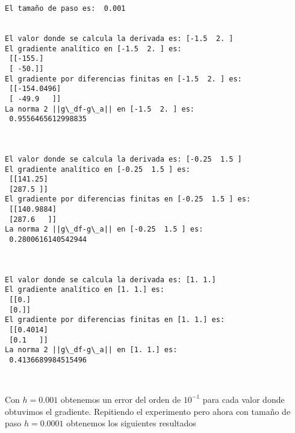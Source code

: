 \documentclass[11pt]{article}
\begin{document}
    \begin{Verbatim}[commandchars=\\\{\}]
El tamaño de paso es:  0.001


El valor donde se calcula la derivada es: [-1.5  2. ]
El gradiente analítico en [-1.5  2. ] es:
 [[-155.]
 [ -50.]]
El gradiente por diferencias finitas en [-1.5  2. ] es:
 [[-154.0496]
 [ -49.9   ]]
La norma 2 ||g\_df-g\_a|| en [-1.5  2. ] es:
 0.9556465612998835



El valor donde se calcula la derivada es: [-0.25  1.5 ]
El gradiente analítico en [-0.25  1.5 ] es:
 [[141.25]
 [287.5 ]]
El gradiente por diferencias finitas en [-0.25  1.5 ] es:
 [[140.9884]
 [287.6   ]]
La norma 2 ||g\_df-g\_a|| en [-0.25  1.5 ] es:
 0.2800616140542944



El valor donde se calcula la derivada es: [1. 1.]
El gradiente analítico en [1. 1.] es:
 [[0.]
 [0.]]
El gradiente por diferencias finitas en [1. 1.] es:
 [[0.4014]
 [0.1   ]]
La norma 2 ||g\_df-g\_a|| en [1. 1.] es:
 0.4136689984515496



    \end{Verbatim}

    Con \(h=0.001\) obtenemos un error del orden de \(10^{-1}\) para cada
valor donde obtuvimos el gradiente. Repitiendo el experimento pero ahora
con tamaño de paso \(h=0.0001\) obtenemos los siguientes resultados
\end{document}

